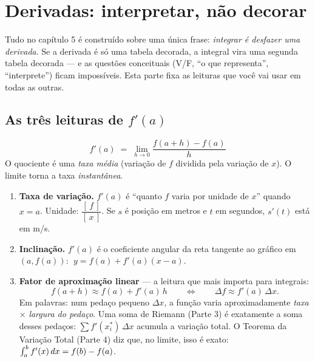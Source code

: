 \section{Derivadas: interpretar, não decorar}

Tudo no capítulo 5 é construído sobre uma única frase: \emph{integrar é desfazer uma derivada}. Se a derivada é só uma tabela decorada, a integral vira uma segunda tabela decorada --- e as questões conceituais (V/F, ``o que representa'', ``interprete'') ficam impossíveis. Esta parte fixa as leituras que você vai usar em todas as outras.

\subsection{As três leituras de $f'(a)$}

\begin{definicao}[{Definição}]
\[
f'(a)\;=\;\lim_{h\to 0}\frac{f(a+h)-f(a)}{h}
\]
O quociente é uma \emph{taxa média} (variação de $f$ dividida pela variação de $x$). O limite torna a taxa \emph{instantânea}.
\end{definicao}

\begin{enumerate}[leftmargin=1.6em, itemsep=3pt]
\item \textbf{Taxa de variação.} $f'(a)$ é ``quanto $f$ varia por unidade de $x$'' quando $x = a$. Unidade: $\dfrac{[\,f\,]}{[\,x\,]}$. Se $s$ é posição em metros e $t$ em segundos, $s'(t)$ está em m/s.
\item \textbf{Inclinação.} $f'(a)$ é o coeficiente angular da reta tangente ao gráfico em $(a, f(a))$:
$\;y = f(a) + f'(a)(x-a)$.
\item \textbf{Fator de aproximação linear} --- a leitura que mais importa para integrais:
\[
f(a+h)\approx f(a) + f'(a)\,h \qquad\Longleftrightarrow\qquad \Delta f \approx f'(a)\,\Delta x .
\]
Em palavras: num pedaço pequeno $\Delta x$, a função varia aproximadamente \emph{taxa} $\times$ \emph{largura do pedaço}. Uma soma de Riemann (Parte 3) é exatamente a soma desses pedaços: $\sum f'(x_i^*)\,\Delta x$ acumula a variação total. O Teorema da Variação Total (Parte 4) diz que, no limite, isso é exato: $\int_a^b f'(x)\,dx = f(b)-f(a)$.
\end{enumerate}

